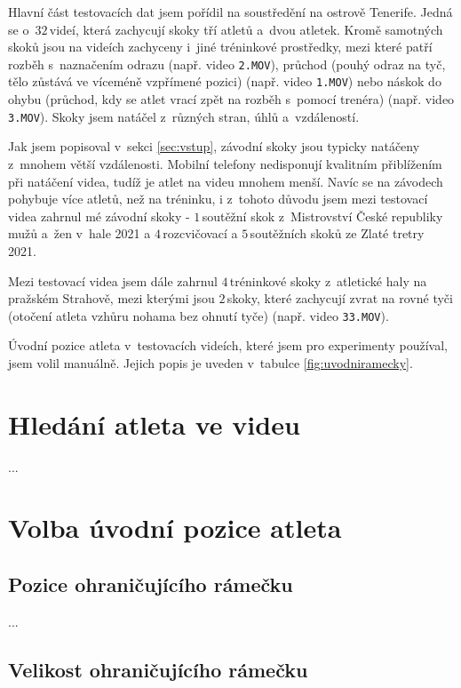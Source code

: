 Hlavní část testovacích dat jsem pořídil na soustředění na ostrově Tenerife. Jedná se o~$32$\,\rm videí, která zachycují skoky tří atletů a~dvou atletek. Kromě samotných skoků jsou na videích zachyceny i~jiné tréninkové prostředky, mezi které patří rozběh s~naznačením odrazu (např. video \texttt{2.MOV}), průchod (pouhý odraz na tyč, tělo zůstává ve víceméně vzpřímené pozici) (např. video \texttt{1.MOV}) nebo náskok do ohybu (průchod, kdy se atlet vrací zpět na rozběh s~pomocí trenéra) (např. video \texttt{3.MOV}). Skoky jsem natáčel z~různých stran, úhlů a~vzdáleností.

Jak jsem popisoval v~sekci \ref{sec:vstup}, závodní skoky jsou typicky natáčeny z~mnohem větší vzdálenosti. Mobilní telefony nedisponují kvalitním přiblížením při natáčení videa, tudíž je atlet na videu mnohem menší. Navíc se na závodech pohybuje více atletů, než na tréninku, i z~tohoto důvodu jsem mezi testovací videa zahrnul mé závodní skoky - $1$\,\rm soutěžní skok z~Mistrovství České republiky mužů a~žen v~hale 2021 a $4$\,\rm rozcvičovací a $5$\,\rm soutěžních skoků ze Zlaté tretry 2021.

Mezi testovací videa jsem dále zahrnul $4$\,\rm tréninkové skoky z~atletické haly na pražském Strahově, mezi kterými jsou $2$\,\rm skoky, které zachycují zvrat na rovné tyči (otočení atleta vzhůru nohama bez ohnutí tyče) (např. video \texttt{33.MOV}).

Úvodní pozice atleta v~testovacích videích, které jsem pro experimenty používal, jsem volil manuálně. Jejich popis je uveden v~tabulce \ref{fig:uvodniramecky}.



\section{Hledání atleta ve videu}

...



\section{Volba úvodní pozice atleta}

\subsection{Pozice ohraničujícího rámečku}

...



\subsection{Velikost ohraničujícího rámečku}

